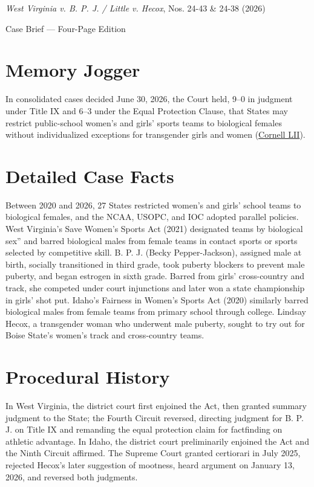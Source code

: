 \documentclass[12pt]{article}
\begin{document}
\begin{center}
{\LARGE \textit{West Virginia v. B. P. J. / Little v. Hecox}, Nos. 24-43 \& 24-38 (2026)\par}
\vspace{0.8em}
{\large Case Brief --- Four-Page Edition\par}
\end{center}
\vspace{1em}

\section{Memory Jogger}

In consolidated cases decided June 30, 2026, the Court held, 9--0 in judgment under Title IX and 6--3 under the Equal Protection Clause, that States may restrict public-school women's and girls' sports teams to biological females without individualized exceptions for transgender girls and women (\href{https://www.law.cornell.edu/supremecourt/text/24-43}{Cornell LII}).

\section{Detailed Case Facts}

Between 2020 and 2026, 27 States restricted women's and girls' school teams to biological females, and the NCAA, USOPC, and IOC adopted parallel policies. West Virginia's Save Women's Sports Act (2021) designated teams by biological sex'' and barred biological males from female teams in contact sports or sports selected by competitive skill. B. P. J. (Becky Pepper-Jackson), assigned male at birth, socially transitioned in third grade, took puberty blockers to prevent male puberty, and began estrogen in sixth grade. Barred from girls' cross-country and track, she competed under court injunctions and later won a state championship in girls' shot put. Idaho's Fairness in Women's Sports Act (2020) similarly barred biological males from female teams from primary school through college. Lindsay Hecox, a transgender woman who underwent male puberty, sought to try out for Boise State's women's track and cross-country teams.

\section{Procedural History}

In West Virginia, the district court first enjoined the Act, then granted summary judgment to the State; the Fourth Circuit reversed, directing judgment for B. P. J. on Title IX and remanding the equal protection claim for factfinding on athletic advantage. In Idaho, the district court preliminarily enjoined the Act and the Ninth Circuit affirmed. The Supreme Court granted certiorari in July 2025, rejected Hecox's later suggestion of mootness, heard argument on January 13, 2026, and reversed both judgments.
\end{document}
